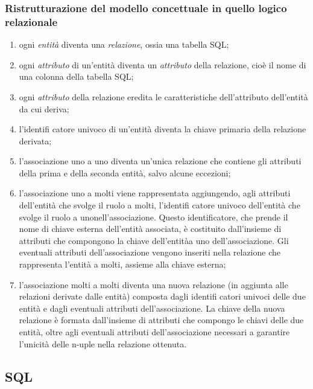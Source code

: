 \documentclass[
]{article}
\providecommand{\tightlist}{%
  \setlength{\itemsep}{0pt}\setlength{\parskip}{0pt}}
\begin{document}
\subsubsection{Ristrutturazione del modello concettuale in quello logico
relazionale}\label{ristrutturazione-del-modello-concettuale-in-quello-logico-relazionale}

\begin{enumerate}
\def\labelenumi{\arabic{enumi}.}
\tightlist
\item
  ogni \emph{entità} diventa una \emph{relazione}, ossia una tabella
  SQL;
\item
  ogni \emph{attributo} di un'entità diventa un \emph{attributo} della
  relazione, cioè il nome di una colonna della tabella SQL;
\item
  ogni \emph{attributo} della relazione eredita le caratteristiche
  dell'attributo dell'entità da cui deriva;
\item
  l'identifi catore univoco di un'entità diventa la chiave primaria
  della relazione derivata;
\item
  l'associazione uno a uno diventa un'unica relazione che contiene gli
  attributi della prima e della seconda entità, salvo alcune eccezioni;
\item
  l'associazione uno a molti viene rappresentata aggiungendo, agli
  attributi dell'entità che svolge il ruolo a molti, l'identifi catore
  univoco dell'entità che svolge il ruolo a unonell'associazione. Questo
  identificatore, che prende il nome di chiave esterna dell'entità
  associata, è costituito dall'insieme di attributi che compongono la
  chiave dell'entitàa uno dell'associazione. Gli eventuali attributi
  dell'associazione vengono inseriti nella relazione che rappresenta
  l'entità a molti, assieme alla chiave esterna;
\item
  l'associazione molti a molti diventa una nuova relazione (in aggiunta
  alle relazioni derivate dalle entità) composta dagli identifi catori
  univoci delle due entità e dagli eventuali attributi
  dell'associazione. La chiave della nuova relazione è formata
  dall'insieme di attributi che compongo le chiavi delle due entità,
  oltre agli eventuali attributi dell'associazione necessari a garantire
  l'unicità delle n-uple nella relazione ottenuta.
\end{enumerate}

\subsection{SQL}\label{sql}
\end{document}
